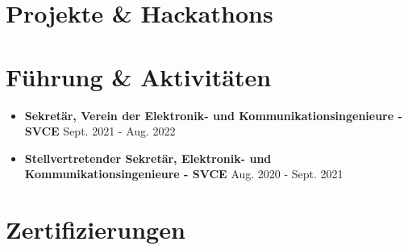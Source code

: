 \documentclass[letterpaper,10.95pt]{article}
\newcommand{\resumeSubHeadingListStart}{\begin{itemize}[leftmargin=0.15in, label={}]}
\newcommand{\resumeSubHeadingListEnd}{\end{itemize}}
\newcommand{\resumeItemListStart}{\begin{itemize}}
\newcommand{\resumeHackathonItemListStart}{\begin{itemize}[topsep=0pt,partopsep=0pt]}
\newcommand{\resumeItemListEnd}{\end{itemize}\vspace{-5pt}}
\newcommand{\resumeHackathonItemListEnd}{\end{itemize}}
\begin{document}


\section{Projekte \& Hackathons}
\vspace{-1pt}
\begin{itemize}[leftmargin=0.15in, itemsep=0.5pt]

\resumeHackathonItemListStart
\resumeHackathonItemListEnd

\resumeHackathonItemListStart
\resumeHackathonItemListEnd

\resumeHackathonItemListStart
\resumeHackathonItemListEnd

\end{itemize}
\vspace{6pt}

\section{Führung \& Aktivitäten}

\resumeSubHeadingListStart

\item \textbf{Sekretär, Verein der Elektronik- und
Kommunikationsingenieure - SVCE}
\hfill {Sept. 2021 - Aug. 2022}
\resumeItemListStart
\resumeItemListEnd

\item \textbf{Stellvertretender Sekretär, Elektronik- und
Kommunikationsingenieure - SVCE}
\hfill {Aug. 2020 - Sept. 2021}
\resumeItemListStart
\resumeItemListEnd

\resumeSubHeadingListEnd

\section{Zertifizierungen}
    \begin{itemize}[leftmargin=0.15in, label={}]
    \small{\item{
    }}
 \end{itemize}
\end{document}
